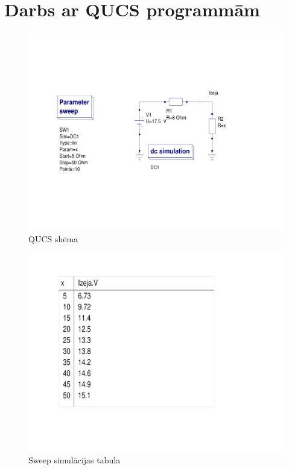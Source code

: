 \documentclass{report}
\begin{document}
\section{Darbs ar QUCS programmām}
\begin{figure}[!h]
    \centering
    \includegraphics[width=\textwidth, height=\textheight, keepaspectratio]{qucs_shema.png}
    \caption{QUCS shēma}
    \label{fig:2.3}
    \end{figure}
 
\begin{figure}[t] 
\centering
    \includegraphics[width=\textwidth, height=220 pt, keepaspectratio]{qucs_tabula_3.png}
    \caption{Sweep simulācijas tabula}
    \label{fig:2.4}
\end{figure}

\newpage
\end{document}
